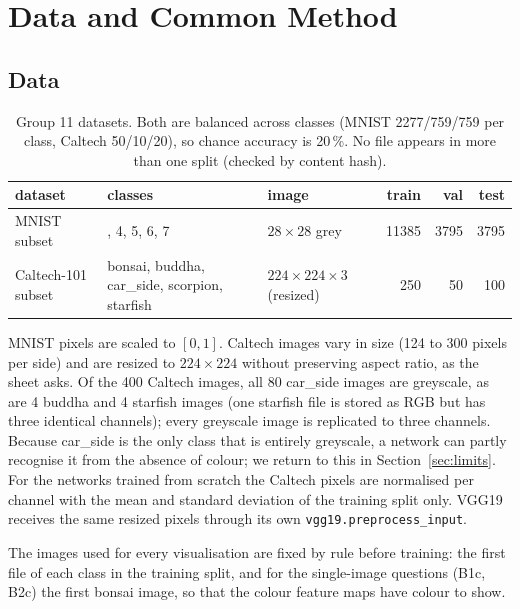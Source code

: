 \documentclass[11pt,a4paper]{article}
\newcommand{\code}[1]{\texttt{#1}}
\begin{document}
\tableofcontents
\newpage

\section{Data and Common Method}\label{sec:method}

\subsection{Data}
\begin{table}[H]\centering\small
\begin{tabular}{@{}l>{\raggedright\arraybackslash}p{3.6cm}lrrr@{}}\toprule
dataset & classes & image & train & val & test \\ \midrule
MNIST subset & 0, 4, 5, 6, 7 & $28\times28$ grey & 11385 & 3795 & 3795 \\
Caltech-101 subset & bonsai, buddha, car\_side, scorpion, starfish & $224\times224\times3$ (resized)
  & 250 & 50 & 100 \\ \bottomrule
\end{tabular}
\caption{Group 11 datasets.  Both are balanced across classes (MNIST 2277/759/759 per class,
Caltech 50/10/20), so chance accuracy is 20\,\%.  No file appears in more than one split (checked
by content hash).}\label{tab:data}
\end{table}
MNIST pixels are scaled to $[0,1]$.  Caltech images vary in size (124 to 300 pixels per side) and
are resized to $224\times224$ without preserving aspect ratio, as the sheet asks.  Of the 400
Caltech images, all 80 car\_side images are greyscale, as are 4 buddha and 4 starfish images (one
starfish file is stored as RGB but has three identical channels); every greyscale image is
replicated to three channels.  Because car\_side is the only class that is
entirely greyscale, a network can partly recognise it from the absence of colour; we return to this
in Section~\ref{sec:limits}.  For the networks trained from scratch the Caltech pixels are
normalised per channel with the mean and standard deviation of the training split only.  VGG19
receives the same resized pixels through its own \code{vgg19.preprocess\_input}.

The images used for every visualisation are fixed by rule before training: the first file of each
class in the training split, and for the single-image questions (B1c, B2c) the first bonsai image,
so that the colour feature maps have colour to show.
\end{document}

